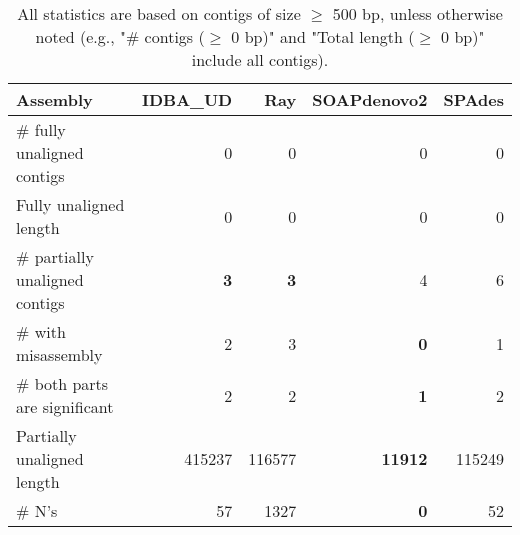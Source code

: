 \documentclass[12pt,a4paper]{article}
\begin{document}
\begin{table}[ht]
\begin{center}
\caption{All statistics are based on contigs of size $\geq$ 500 bp, unless otherwise noted (e.g., "\# contigs ($\geq$ 0 bp)" and "Total length ($\geq$ 0 bp)" include all contigs).}
\begin{tabular}{|l*{4}{|r}|}
\hline
Assembly & IDBA\_UD & Ray & SOAPdenovo2 & SPAdes \\ \hline
\# fully unaligned contigs & 0 & 0 & 0 & 0 \\ \hline
Fully unaligned length & 0 & 0 & 0 & 0 \\ \hline
\# partially unaligned contigs & {\bf 3} & {\bf 3} & 4 & 6 \\ \hline
\hspace{5mm}\# with misassembly & 2 & 3 & {\bf 0} & 1 \\ \hline
\hspace{5mm}\# both parts are significant & 2 & 2 & {\bf 1} & 2 \\ \hline
Partially unaligned length & 415237 & 116577 & {\bf 11912} & 115249 \\ \hline
\# N's & 57 & 1327 & {\bf 0} & 52 \\ \hline
\end{tabular}
\end{center}
\end{table}
\end{document}
